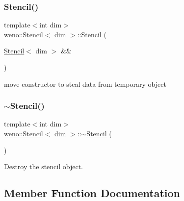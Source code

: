 \subsubsection{\texorpdfstring{Stencil()}{Stencil()}\hspace{0.1cm}{\footnotesize\ttfamily [3/3]}}
{\footnotesize\ttfamily template$<$int dim$>$ \\
\hyperlink{classweno_1_1_stencil}{weno\+::\+Stencil}$<$ dim $>$\+::\hyperlink{classweno_1_1_stencil}{Stencil} (\begin{DoxyParamCaption}\item[{\hyperlink{classweno_1_1_stencil}{Stencil}$<$ dim $>$ \&\&}]{ }\end{DoxyParamCaption})\hspace{0.3cm}{\ttfamily [default]}}



move constructor to steal data from temporary object 

\mbox{\label{classweno_1_1_stencil_adadca4d1773a270be6a84a0e9b7c7b0c}} 
\subsubsection{\texorpdfstring{$\sim$\+Stencil()}{~Stencil()}}
{\footnotesize\ttfamily template$<$int dim$>$ \\
\hyperlink{classweno_1_1_stencil}{weno\+::\+Stencil}$<$ dim $>$\+::$\sim$\hyperlink{classweno_1_1_stencil}{Stencil} (\begin{DoxyParamCaption}{ }\end{DoxyParamCaption})\hspace{0.3cm}{\ttfamily [default]}}



Destroy the stencil object. 



\subsection{Member Function Documentation}
\mbox{\label{classweno_1_1_stencil_a5f739b2659593d8c83b02a01a003d6a5}} 

